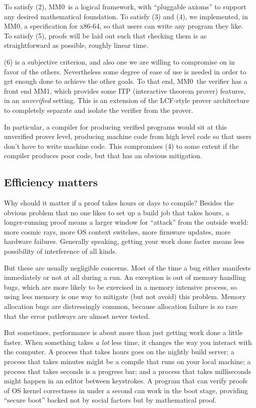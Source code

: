 \documentclass[runningheads]{llncs}
\newcommand{\mmO}{\textsf{MM0}}
\begin{document}
To satisfy (2), \mmO\ is a logical framework, with ``pluggable axioms'' to support any desired mathematical foundation. To satisfy (3) and (4), we implemented, in \mmO, a specification for x86-64, so that users can write any program they like. To satisfy (5), proofs will be laid out such that checking them is as straightforward as possible, roughly linear time.

(6) is a subjective criterion, and also one we are willing to compromise on in favor of the others. Nevertheless some degree of ease of use is needed in order to get enough done to achieve the other goals. To that end, \mmO\ the verifier has a front end \textsf{MM1}, which provides some ITP (interactive theorem prover) features, in an \emph{unverified} setting. This is an extension of the LCF-style prover architecture to completely separate and isolate the verifier from the prover.

In particular, a compiler for producing verified programs would sit at this unverified prover level, producing machine code from high level code so that users don't have to write machine code. This compromises (4) to some extent if the compiler produces poor code, but that has an obvious mitigation.

\subsection{Efficiency matters}

Why should it matter if a proof takes hours or days to compile? Besides the obvious problem that no one likes to set up a build job that takes hours, a longer-running proof means a larger window for ``attack'' from the outside world: more cosmic rays, more OS context switches, more firmware updates, more hardware failures. Generally speaking, getting your work done faster means less possibility of interference of all kinds.

But these are usually negligible concerns. Most of the time a bug either manifests immediately or not at all during a run. An exception is out of memory handling bugs, which are more likely to be exercised in a memory intensive process, so using less memory is one way to mitigate (but not avoid) this problem. Memory allocation bugs are distressingly common, because allocation failure is so rare that the error pathways are almost never tested.

But sometimes, performance is about more than just getting work done a little faster. When something takes \emph{a lot} less time, it changes the way you interact with the computer. A process that takes hours goes on the nightly build server; a process that takes minutes might be a compile that runs on your local machine; a process that takes seconds is a progress bar; and a process that takes milliseconds might happen in an editor between keystrokes. A program that can verify proofs of OS kernel correctness in under a second can work in the boot stage, providing ``secure boot'' backed not by social factors but by mathematical proof.
\end{document}
